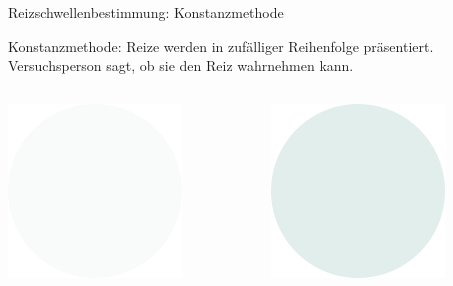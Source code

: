 \documentclass[aspectratio=169]{beamer}
\begin{document}
\begin{frame}{Reizschwellenbestimmung: Konstanzmethode}
  
  Konstanzmethode: Reize werden in zufälliger Reihenfolge präsentiert. Versuchsperson sagt, ob sie den Reiz wahrnehmen kann.
  

\begin{columns}[c]
\begin{column}{1.5cm}
\includegraphics[width=\textwidth]{reizschwelle_seriell_2.png}
\end{column}
\begin{column}{1.5cm}
\includegraphics[width=\textwidth]{reizschwelle_seriell_5.png}

\end{column}
\end{columns}
\end{frame}
\end{document}
